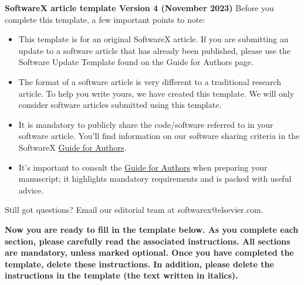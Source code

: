 \documentclass[preprint,12pt, a4paper]{elsarticle}
\begin{document}
\renewcommand{\labelenumii}{\arabic{enumi}.\arabic{enumii}}

\begin{frontmatter}

  {\large\textbf{SoftwareX article template Version 4 (November 2023)}}
  Before you complete this template, a few important points to note:
  \begin{itemize}
\item	This template is for an original SoftwareX article. If you are submitting an update to a software article that has already been published, please use the Software Update Template found on the Guide for Authors page.
\item	The format of a software article is very different to a traditional research article. To help you write yours, we have created this template. We will only consider software articles submitted using this template.
\item	It is mandatory to publicly share the code/software referred to in your software article. You’ll find information on our software sharing criteria in the SoftwareX \href{https://www.elsevier.com/journals/softwarex/2352-7110/guide-for-authors}{Guide for Authors}.  
\item	It’s important to consult the \href{https://www.elsevier.com/journals/softwarex/2352-7110/guide-for-authors}{Guide for Authors} when preparing your manuscript; it highlights mandatory requirements and is packed with useful advice.
\end{itemize}
%
Still got questions?
Email our editorial team at softwarex@elsevier.com.

\textbf{Now you are ready to fill in the template below. As you complete each section, please carefully read the associated instructions. All sections are mandatory, unless marked optional.
Once you have completed the template, delete these instructions. In addition, please delete the instructions in the template (the text written in italics).}
 




\end{frontmatter}
\end{document}
